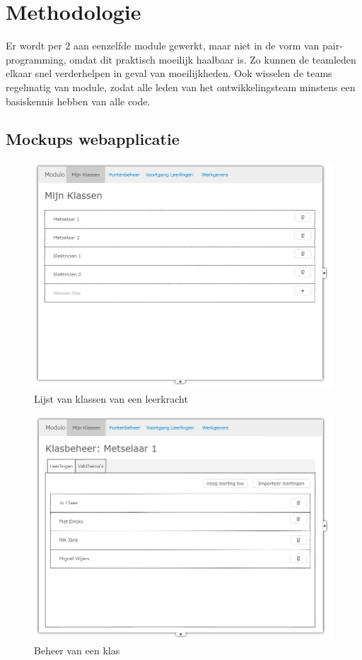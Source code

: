 \documentclass[a4paper]{article}
\begin{document}
\section{Methodologie}
Er wordt per 2 aan eenzelfde module gewerkt, maar niet in de vorm van pair-programming, omdat dit praktisch moeilijk haalbaar is. Zo kunnen de teamleden elkaar snel verderhelpen in geval van moeilijkheden. Ook wisselen de teams regelmatig van module, zodat alle leden van het ontwikkelingsteam minstens een basiskennis hebben van alle code.


\newpage
\begin{appendices}
\section{Mockups webapplicatie}

\begin{figure}[H]
  \centerline{\includegraphics[width=\textwidth]{web_klassen}}
  \caption{Lijst van klassen van een leerkracht}
  \label{fig:web_klassen}
\end{figure}

\begin{figure}[H]
  \centerline{\includegraphics[width=\textwidth]{web_klasbeheer}}
  \caption{Beheer van een klas}
  \label{fig:web_klasbeheer}
\end{figure}


\end{appendices}
\end{document}
